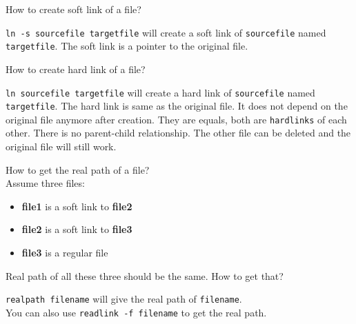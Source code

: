 \begin{qs}
  How to create soft link of a file?
\end{qs}

\begin{ans}
  \lstinline|ln -s sourcefile targetfile| will create a soft link of \lstinline|sourcefile|
  named \lstinline|targetfile|.
  The soft link is a pointer to the original file.
\end{ans}

\begin{qs}
  How to create hard link of a file?
\end{qs}

\begin{ans}
  \lstinline|ln sourcefile targetfile| will create a hard link of \lstinline|sourcefile|
  named \lstinline|targetfile|. The hard link is same as the original file. It does
  not depend on the original file anymore after creation. They are equals,
  both are \lstinline|hardlinks| of each other. There is no parent-child relationship.
  The other file can be deleted and the original file will still work.
\end{ans}

\begin{qs}
  How to get the real path of a file?\\
  Assume three files:
  \begin{itemize}
    \item \textbf{file1} is a soft link to \textbf{file2}
    \item \textbf{file2} is a soft link to \textbf{file3}
    \item \textbf{file3} is a regular file
  \end{itemize}
  Real path of all these three should be the same. How to get that?
\end{qs}

\begin{ans}
  \lstinline|realpath filename| will give the real path of \lstinline|filename|. \\
  You can also use \lstinline|readlink -f filename| to get the real path.
\end{ans}


